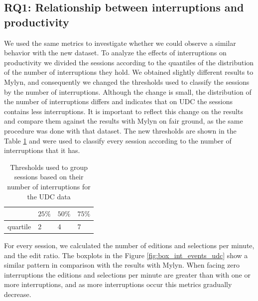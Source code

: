 \documentclass[times]{smrauth}
\begin{document}
\subsection{RQ1: Relationship between interruptions and productivity}
We used the same metrics to investigate whether we could observe a similar behavior with the new dataset. To analyze the effects of interruptions on productivity we divided the sessions according to the quantiles of the distribution of the number of interruptions they hold. We obtained slightly different results to Mylyn, and consequently we changed the thresholds used to classify the sessions by the number of interruptions. Although the change is small, the distribution of the number of interruptions differs and indicates that on UDC the sessions contains less interruptions. It is important to reflect this change on the results and compare them against the results with Mylyn on fair ground, as the same procedure was done with that dataset. The new thresholds are shown in the Table \ref{tbl:quartil_int_udc} and were used to classify every session according to the number of interruptions that it has.

\begin{table}[ht!]
\tiny
\renewcommand{\arraystretch}{1.3}
\caption{Thresholds used to group sessions based on their number of interruptions for the UDC data} %
\label{tbl:quartil_int_udc}
\centering
\begin{tabular}{l | p{0.6cm} | p{0.6cm} | p{0.6cm}} 
     & $25\%$ & $50\%$ & $75\%$ \\  
  \hline 
  quartile &  2 & 4 & 7  \\   
\end{tabular}
\end{table}

For every session, we calculated the number of editions and selections per minute, and the edit ratio. The boxplots in the Figure \ref{fig:box_int_events_udc} show a similar pattern in comparison with the results with Mylyn. When facing zero interruptions the editions and selections per minute are greater than with one or more interruptions, and as more interruptions occur this metrics gradually decrease.
\end{document}
